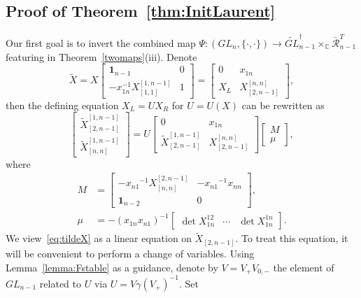 \documentclass{amsart}
\theoremstyle{definition}
\theoremstyle{remark}
\numberwithin{equation}{section}
\numberwithin{theorem}{section}
\def\B{{\mathcal B}}
\def\C{{\mathbb C}}
\def\N{\mathcal N}
\def\RR{{\mathcal R}}
\def\one{\mathbf 1}
\def\wx{{\widetilde{X}}}
\def\Poi{{\{{\cdot},{\cdot}\}}}
\begin{document}
\subsection{Proof of Theorem~\ref{thm:InitLaurent}}\label{proofInitLaurent}
Our first goal is to invert the combined map $\Psi : (GL_n,\Poi)\to \widetilde{GL}_{n-1}^{\dag}\times_\C \bar\RR_{n-1}^T$ featuring in Theorem~\ref{twomaps}(iii). Denote
\begin{equation}
\label{eq:tildeXdef}
\widetilde{X} = X \begin{bmatrix} \one_{n-1} & 0 \\ -x_{1n}^{-1}X_{[1,1]}^{[1,n-1]} & 1\end{bmatrix} =   
\begin{bmatrix} 0 & x_{1n} \\ X_L & X^{[n,n]}_{[2,n-1]}\end{bmatrix},
\end{equation}
then the defining equation $X_L = U X_R$ for $U=U(X)$ can be rewritten as
\begin{equation}
\label{eq:tildeX}
\begin{bmatrix}{\widetilde{X}}^{[1,n-1]}_{[2,n-1]}\\ \widetilde{X}_{[n,n]}^{[1,n-1]}\end{bmatrix}  = 
U  \begin{bmatrix} 0 & x_{1n}\\ {\widetilde{X}}^{[1,n-1]}_{[2,n-1]}  & X^{[n,n]}_{[2,n-1]}\end{bmatrix} 
\begin{bmatrix} M \\ \mu \end{bmatrix},
\end{equation}
where
\begin{align*}
 M &= \begin{bmatrix}  -{x_{n1}}^{-1}X_{[n,n]}^{[2,n-1]} & - {x_{n1}}^{-1}{x_{nn}}\\ \one_{n-2} & 0 \end{bmatrix},\\
\mu&=-(x_{1n} x_{n1})^{-1}\begin{bmatrix}\det X_{1n}^{12} & \cdots & \det X_{1n}^{1n}\end{bmatrix}.
\end{align*}
We view~\eqref{eq:tildeX} as a linear equation on $\wx_{[2,n-1]}$.  To treat this equation, it will be convenient to 
perform a change of variables. Using Lemma~\ref{lemma:Fstable} as a guidance, denote by $V=V_+V_{0,-}$ 
the element of $GL_{n-1}$ related to $U$ via $U = V \gamma(V_+)^{-1}$. Set
\end{document}
